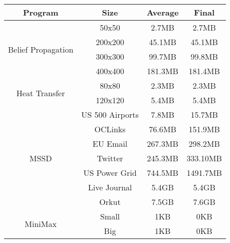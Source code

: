 \begin{tabular}{c | c | c | c} \hline
	\textbf{Program} & \textbf{Size} & \textbf{Average} & \textbf{Final} \\ \hline \hline
	\multirow{4}{*}{Belief Propagation}  & 50x50 & 2.7MB & 2.7MB\\
		 & 200x200 & 45.1MB & 45.1MB\\
		 & 300x300 & 99.7MB & 99.8MB\\
		 & 400x400 & 181.3MB & 181.4MB\\
	\hline
	\multirow{2}{*}{Heat Transfer}  & 80x80 & 2.3MB & 2.3MB\\
		 & 120x120 & 5.4MB & 5.4MB\\
	\hline
	\multirow{7}{*}{MSSD}  & US 500 Airports & 7.8MB & 15.7MB\\
		 & OCLinks & 76.6MB & 151.9MB\\
		 & EU Email & 267.3MB & 298.2MB\\
		 & Twitter & 245.3MB & 333.10MB\\
		 & US Power Grid & 744.5MB & 1491.7MB\\
		 & Live Journal & 5.4GB & 5.4GB\\
		 & Orkut & 7.5GB & 7.6GB\\
	\hline
	\multirow{2}{*}{MiniMax}  & Small & 1KB & 0KB\\
		 & Big & 1KB & 0KB\\
	\hline
\end{tabular}
